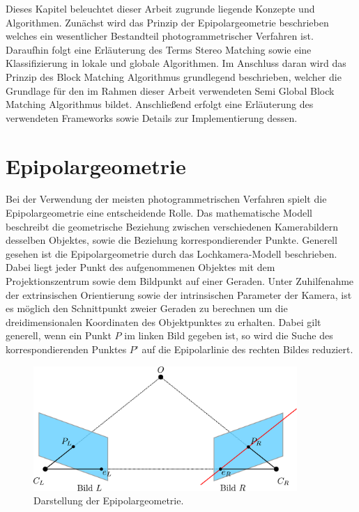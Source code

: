 Dieses Kapitel beleuchtet dieser Arbeit zugrunde liegende Konzepte und Algorithmen. Zunächst wird das Prinzip der Epipolargeometrie beschrieben welches ein wesentlicher Bestandteil photogrammetrischer Verfahren ist. Daraufhin folgt eine Erläuterung des Terms Stereo Matching sowie eine Klassifizierung in lokale und globale Algorithmen. Im Anschluss daran wird das Prinzip des Block Matching Algorithmus grundlegend beschrieben, welcher die Grundlage für den im Rahmen dieser Arbeit verwendeten Semi Global Block Matching Algorithmus bildet. Anschließend erfolgt eine Erläuterung des verwendeten Frameworks sowie Details zur Implementierung dessen.

\section{Epipolargeometrie}
\label{sec:epipolargeometrie}
Bei der Verwendung der meisten photogrammetrischen Verfahren spielt die Epipolargeometrie eine entscheidende Rolle. Das mathematische Modell beschreibt die geometrische Beziehung zwischen verschiedenen Kamerabildern desselben Objektes, sowie die Beziehung korrespondierender Punkte. Generell gesehen ist die Epipolargeometrie durch das Lochkamera-Modell beschrieben. Dabei liegt jeder Punkt des aufgenommenen Objektes mit dem Projektionszentrum sowie dem Bildpunkt auf einer Geraden. Unter Zuhilfenahme der extrinsischen Orientierung sowie der intrinsischen Parameter der Kamera, ist es möglich den Schnittpunkt zweier Geraden zu berechnen um die dreidimensionalen Koordinaten des Objektpunktes zu erhalten. Dabei gilt generell, wenn ein Punkt $P$ im linken Bild gegeben ist, so wird die Suche des korrespondierenden Punktes $P’$ auf die Epipolarlinie des rechten Bildes reduziert. 

\begin{figure}[h]
	\begin{center}
		\includegraphics[width=10cm]{img/epipolar_geometry.pdf}
	\end{center}
	\caption{Darstellung der Epipolargeometrie.}
	\label{fig:epipolar_geometry}
\end{figure}

